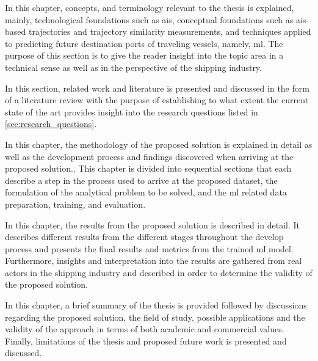 
In this chapter, concepts, and terminology relevant to the thesis is explained, mainly, technological foundations such as \acrfull{ais}, conceptual foundations such as \acrshort{ais}-based trajectories and trajectory similarity measurements, and techniques applied to predicting future destination ports of traveling vessels, namely, \acrfull{ml}. The purpose of this section is to give the reader insight into the topic area in a technical sense as well as in the perspective of the shipping industry.


In this section, related work and literature is presented and discussed in the form of a literature review with the purpose of establishing to what extent the current state of the art provides insight into the research questions listed in \cref{sec:research_questions}.


In this chapter, the methodology of the proposed solution is explained in detail as well as the development process and findings discovered when arriving at the proposed solution.. This chapter is divided into sequential sections that each describe a step in the process used to arrive at the proposed dataset, the formulation of the analytical problem to be solved, and the \acrfull{ml} related data preparation, training, and evaluation.


In this chapter, the results from the proposed solution is described in detail. It describes different results from the different stages throughout the develop process and presents the final results and metrics from the trained \acrfull{ml} model. Furthermore, insights and interpretation into the results are gathered from real actors in the shipping industry and described in order to determine the validity of the proposed solution.


In this chapter, a brief summary of the thesis is provided followed by discussions regarding the proposed solution, the field of study, possible applications and the validity of the approach in terms of both academic and commercial values. Finally, limitations of the thesis and proposed future work is presented and discussed.

